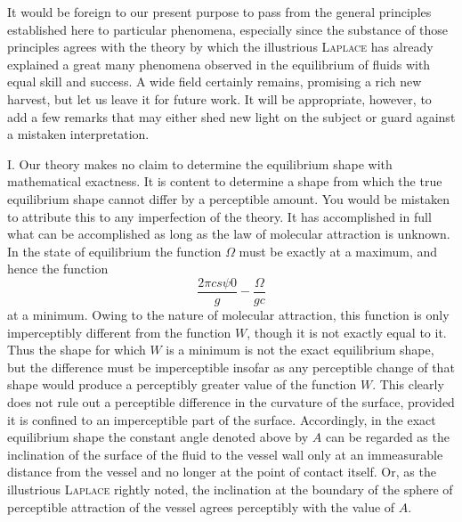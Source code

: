 It would be foreign to our present purpose to pass from the general principles established here to particular phenomena, especially since the substance of those principles agrees with the theory by which the illustrious \textsc{Laplace} has already explained a great many phenomena observed in the equilibrium of fluids with equal skill and success. A wide field certainly remains, promising a rich new harvest, but let us leave it for future work. It will be appropriate, however, to add a few remarks that may either shed new light on the subject or guard against a mistaken interpretation.

I. Our theory makes no claim to determine the equilibrium shape with mathematical exactness. It is content to determine a shape from which the true equilibrium shape cannot differ by a perceptible amount. You would be mistaken to attribute this to any imperfection of the theory. It has accomplished in full what can be accomplished as long as the law of molecular attraction is unknown. In the state of equilibrium the function $\Omega$ must be exactly at a maximum, and hence the function
\[
\frac{2\pi cs\psi0}g-\frac\Omega{gc}
\]
at a minimum. Owing to the nature of molecular attraction, this function is only imperceptibly different from the function $W$, though it is not exactly equal to it. Thus the shape for which $W$ is a minimum is not the exact equilibrium shape, but the difference must be imperceptible insofar as any perceptible change of that shape would produce a perceptibly greater value of the function $W$. This clearly does not rule out a perceptible difference in the curvature of the surface, provided it is confined to an imperceptible part of the surface. Accordingly, in the exact equilibrium shape the constant angle denoted above by $A$ can be regarded as the inclination of the surface of the fluid to the vessel wall only at an immeasurable distance from the vessel and no longer at the point of contact itself. Or, as the illustrious \textsc{Laplace} rightly noted, the inclination at the boundary of the sphere of perceptible attraction of the vessel agrees perceptibly with the value of $A$.

